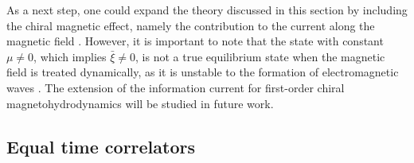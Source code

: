 \documentclass[a4paper, amsfonts, amssymb, amsmath, reprint, showkeys, nofootinbib, twoside,notitlepage,onecolumn,preprintnumbers]{revtex4-2}
\theoremstyle{definition}
\theoremstyle{theorem}
\theoremstyle{corollary}
\begin{document}
As a next step, one could expand the theory discussed in this section by including the chiral magnetic effect, namely the contribution to the current along the magnetic field \cite{Kharzeev:2015znc}. However, it is important to note that the state with constant $\mu\neq 0$, which implies $\bar{\xi} \neq 0$, is not a true equilibrium state when the magnetic field is treated dynamically, as it is unstable to the formation of electromagnetic waves \cite{Akamatsu:2013pjd, Manuel:2015zpa, Hirono:2015rla,Avdoshkin:2014gpa, Shovkovy:2021yyw}. The extension of the information current for first-order chiral magnetohydrodynamics will be studied in future work. 



\subsection{Equal time correlators}
\end{document}
